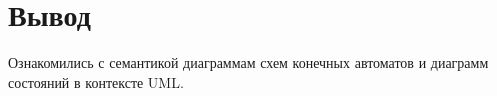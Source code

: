 \newpage

\section{Вывод}

Ознакомились с семантикой диаграммам схем конечных автоматов и диаграмм состояний в контексте UML.
